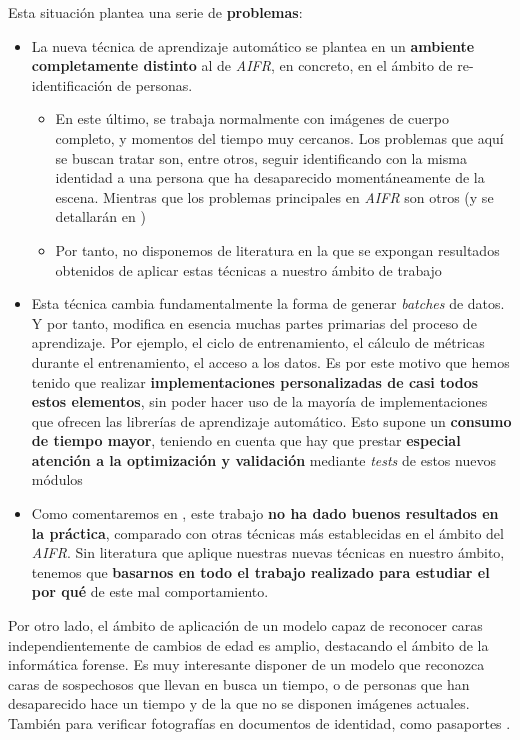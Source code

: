 Esta situación plantea una serie de \textbf{problemas}:

\begin{itemize}
    \item La nueva técnica de aprendizaje automático se plantea en un \textbf{ambiente completamente distinto} al de \textit{AIFR}, en concreto, en el ámbito de re-identificación de personas.
        \begin{itemize}
            \item En este último, se trabaja normalmente con imágenes de cuerpo completo, y momentos del tiempo muy cercanos. Los problemas que aquí se buscan tratar son, entre otros, seguir identificando con la misma identidad a una persona que ha desaparecido momentáneamente de la escena. Mientras que los problemas principales en \textit{AIFR} son otros (y se detallarán en )
            \item Por tanto, no disponemos de literatura en la que se expongan resultados obtenidos de aplicar estas técnicas a nuestro ámbito de trabajo
        \end{itemize}
    \item Esta técnica cambia fundamentalmente la forma de generar \textit{batches} de datos. Y por tanto, modifica en esencia muchas partes primarias del proceso de aprendizaje. Por ejemplo, el ciclo de entrenamiento, el cálculo de métricas durante el entrenamiento, el acceso a los datos. Es por este motivo que hemos tenido que realizar \textbf{implementaciones personalizadas de casi todos estos elementos}, sin poder hacer uso de la mayoría de implementaciones que ofrecen las librerías de aprendizaje automático. Esto supone un \textbf{consumo de tiempo mayor}, teniendo en cuenta que hay que prestar \textbf{especial atención a la optimización y validación} mediante \textit{tests} de estos nuevos módulos
    \item Como comentaremos en , este trabajo \textbf{no ha dado buenos resultados en la práctica}, comparado con otras técnicas más establecidas en el ámbito del \textit{AIFR}. Sin literatura que aplique nuestras nuevas técnicas en nuestro ámbito, tenemos que \textbf{basarnos en todo el trabajo realizado para estudiar el por qué} de este mal comportamiento.
\end{itemize}

Por otro lado, el ámbito de aplicación de un modelo capaz de reconocer caras independientemente de cambios de edad es amplio, destacando el ámbito de la informática forense. Es muy interesante disponer de un modelo que reconozca caras de sospechosos que llevan en busca un tiempo, o de personas que han desaparecido hace un tiempo y de la que no se disponen imágenes actuales. También para verificar fotografías en documentos de identidad, como pasaportes \cite{informatica:tecnica_sintesis_aifr}.

